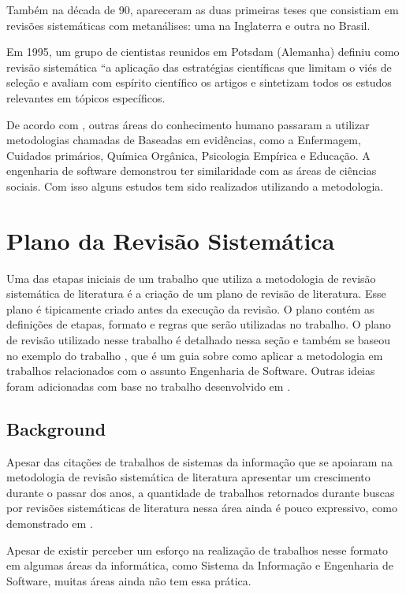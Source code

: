 Também na década de 90, apareceram as duas primeiras teses que consistiam em revisões sistemáticas com metanálises: uma na Inglaterra e outra no Brasil.

Em 1995, um grupo de cientistas reunidos em Potsdam (Alemanha) definiu como revisão sistemática “a aplicação das estratégias científicas que limitam o viés de seleção e avaliam com espírito científico os artigos e sintetizam todos os estudos relevantes em tópicos específicos.

De acordo com \cite{Dyba2005}, outras áreas do conhecimento humano passaram a utilizar metodologias chamadas de Baseadas em evidências, como a Enfermagem, Cuidados primários, Química Orgânica, Psicologia Empírica e Educação. A engenharia de software demonstrou ter similaridade com as áreas de ciências sociais. Com isso alguns estudos tem sido realizados utilizando a metodologia.

\section{Plano da Revisão Sistemática} \label{sec:planoRevisao}

 Uma das etapas iniciais de um trabalho que utiliza a metodologia de revisão sistemática de literatura é a criação de um plano de revisão de literatura. Esse plano é tipicamente criado  antes da execução da revisão. O plano contém as definições de etapas, formato e regras que serão utilizadas no trabalho. O plano de revisão utilizado nesse trabalho é detalhado nessa seção e também se baseou no exemplo do trabalho \cite{kitchenham2007guidelines}, que é um guia sobre como aplicar a metodologia em trabalhos relacionados com o assunto Engenharia de Software. Outras ideias foram adicionadas com base no trabalho desenvolvido em \cite{de2023gestao}.

\subsection{Background}
Apesar das citações de trabalhos de sistemas da informação que se apoiaram na metodologia de revisão sistemática de literatura apresentar um crescimento durante o passar dos anos, a quantidade de trabalhos retornados durante buscas por revisões sistemáticas de literatura nessa área ainda é pouco expressivo, como demonstrado em \cite{kitchenham_systematic_2009}.

Apesar de existir perceber um esforço na realização de trabalhos nesse formato em algumas áreas da informática, como Sistema da Informação e Engenharia de Software, muitas áreas ainda não tem essa prática.

